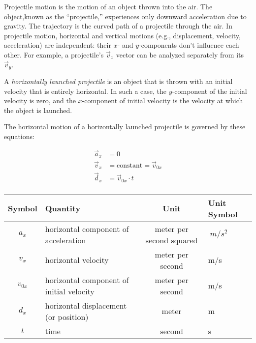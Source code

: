 \documentclass{article}
\begin{document}
Projectile motion is the motion of an object thrown into the air. The object,known as the ``projectile,'' experiences only downward acceleration due to gravity. The trajectory is the curved path of a projectile through the air. In projectile motion, horizontal and vertical motions (e.g., displacement, velocity, acceleration) are independent: their $x$- and $y$-components don't influence each other. For example, a projectile's $\vec{v}_x$ vector can be analyzed separately from its $\vec{v}_y$.

A \textit{horizontally launched projectile} is an object that is thrown with an initial velocity that is entirely horizontal. In such a case, the $y$-component of the initial velocity is zero, and the $x$-component of initial velocity is the velocity at which the object is launched. 

\begin{mdframed}[backgroundcolor=black!10]
The horizontal motion of a horizontally launched projectile is governed by these equations:
\vspace{-1em}

\begin{align*}
    \vec{a}_x &= 0\\[0.5ex]
    \vec{v}_x &= \mathrm{constant} = \vec{v}_{0x}\\[0.5ex]
    \vec{d}_x &= \vec{v}_{0x} \cdot t\\[0.5ex]
\end{align*}
\vspace{-3em}

\begin{center}
        \begin{tabular}{cl|cl}
    \hline
    \textbf{Symbol} & \textbf{Quantity} & \textbf{Unit} & \textbf{Unit Symbol}  \\
    \hline\hline
        $a_x$ & horizontal component of acceleration & meter per second squared & $\SI{}{m/s^2}$\\
        $v_x$ & horizontal velocity & meter per second & m/s\\
        $v_{0x}$ & horizontal component of initial velocity & meter per second & m/s\\
        $d_x$ & horizontal displacement (or position) & meter & m\\
        $t$ & time & second & s\\
    \hline
    \end{tabular}
\end{center}
\end{mdframed}
\end{document}
